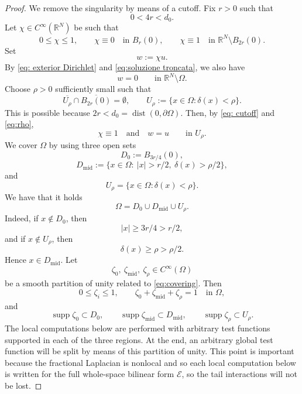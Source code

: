\documentclass[11pt,a4paper]{article}
\begin{document}
\begin{proof}
We remove the singularity by means of a cutoff. Fix
\(r>0\) such that
\[
0<4r<d_0.
\]
Let \(\chi\in C^\infty(\mathbb R^N)\) be such that
\begin{equation}\label{eq: cutoff}
0\le \chi\le1,
\qquad
\chi\equiv0 \quad\text{in }B_r(0),
\qquad
\chi\equiv1 \quad\text{in }\mathbb R^N\setminus B_{2r}(0).
\end{equation}
Set
\begin{equation}\label{eq:soluzione troncata}
w:=\chi u.
\end{equation}
By \eqref{eq: exterior Dirichlet} and \eqref{eq:soluzione troncata}, we also have
\[
w=0
\qquad\text{in }\mathbb R^N\setminus\Omega.
\]
Choose \(\rho>0\) sufficiently small such that
\begin{equation}\label{eq:rho}
\overline{U_\rho}\cap \overline{B_{2r}(0)}=\emptyset,
\qquad
U_\rho:=\{x\in\Omega:\delta(x)<\rho\}.
\end{equation}
This is possible because \(2r<d_0=\operatorname{dist}(0,\partial\Omega)\).
Then, by \eqref{eq: cutoff} and \eqref{eq:rho},
\begin{equation}\label{eq:w = u}
\chi\equiv1\quad\text{and}\quad w=u\qquad\text{in }U_\rho.
\end{equation}
We cover \(\Omega\) by using three open sets
\[
D_0:=B_{3r/4}(0),
\]
\[
D_{\mathrm{mid}}
:=
\{x\in\Omega:\ |x|>r/2,\ \delta(x)>\rho/2\},
\]
and
\[
U_\rho=\{x\in\Omega:\delta(x)<\rho\}.
\]
We have that it holds
\begin{equation}\label{eq:covering}
\Omega=D_0\cup D_{\mathrm{mid}}\cup U_\rho.
\end{equation}
Indeed, if \(x\notin D_0\), then
\[
|x|\ge 3r/4>r/2,
\]
and if \(x\notin U_\rho\), then
\[
\delta(x)\ge \rho>\rho/2.
\]
Hence \(x\in D_{\mathrm{mid}}\).
Let
\[
\zeta_0,\ \zeta_{\mathrm{mid}},\ \zeta_\rho\in C^\infty(\Omega)
\]
be a smooth partition of unity related to \eqref{eq:covering}. Then
\begin{equation}
0\le \zeta_i\le1,
\qquad
\zeta_0+\zeta_{\mathrm{mid}}+\zeta_\rho=1
\quad\text{in }\Omega,
\end{equation}
and
\begin{equation}\label{eq:partition supports}
\operatorname{supp}\zeta_0\subset D_0,
\qquad
\operatorname{supp}\zeta_{\mathrm{mid}}\subset D_{\mathrm{mid}},
\qquad
\operatorname{supp}\zeta_\rho\subset U_\rho.
\end{equation}
The local computations below are performed with arbitrary test functions
supported in each of the three regions. At the end, an arbitrary global test
function will be split by means of this partition of unity. This point is
important because the fractional Laplacian is nonlocal and so each local computation
below is written for the full whole-space bilinear form \(\mathcal E\), so the
tail interactions will not be lost.


\end{proof}
\end{document}

